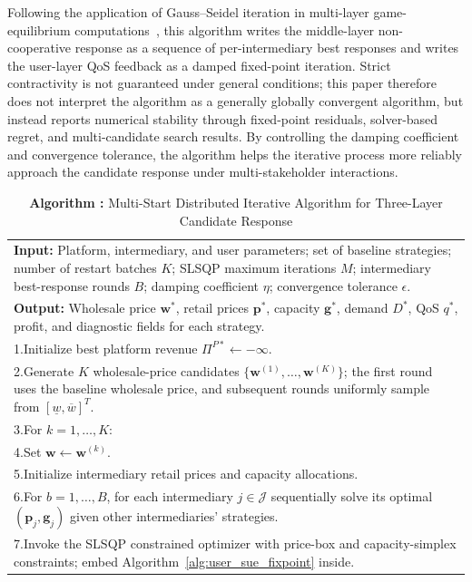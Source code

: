 \documentclass[11pt,a4paper]{article}
\newcounter{algobox}
\renewcommand{\thealgobox}{\arabic{algobox}}
\newcommand{\algcaption}[1]{\refstepcounter{algobox}\caption*{\textbf{Algorithm \thealgobox: }#1}}
\newcommand{\J}{\mathcal{J}}
\newcommand{\D}{D}
\newcommand{\w}{\boldsymbol{w}}
\newcommand{\p}{\boldsymbol{p}}
\newcommand{\g}{\boldsymbol{g}}
\begin{document}
Following the application of Gauss--Seidel iteration in multi-layer game-equilibrium computations~\cite{wang2026hierarchical}, this algorithm writes the middle-layer non-cooperative response as a sequence of per-intermediary best responses and writes the user-layer QoS feedback as a damped fixed-point iteration. Strict contractivity is not guaranteed under general conditions; this paper therefore does not interpret the algorithm as a generally globally convergent algorithm, but instead reports numerical stability through fixed-point residuals, solver-based regret, and multi-candidate search results. By controlling the damping coefficient and convergence tolerance, the algorithm helps the iterative process more reliably approach the candidate response under multi-stakeholder interactions.

\begin{table}[H]
\centering
\algcaption{Multi-Start Distributed Iterative Algorithm for Three-Layer Candidate Response}
\label{alg:full_backward}
\begin{tabular}{p{}}
\toprule
\textbf{Input:} Platform, intermediary, and user parameters; set of baseline strategies; number of restart batches $K$; SLSQP maximum iterations $M$; intermediary best-response rounds $B$; damping coefficient $\eta$; convergence tolerance $\epsilon$.\\
\textbf{Output:} Wholesale price $\w^*$, retail prices $\p^*$, capacity $\g^*$, demand $\D^*$, QoS $q^*$, profit, and diagnostic fields for each strategy.\\
\midrule
1.\quad Initialize best platform revenue $\Pi^{P*}\leftarrow -\infty$.\\
2.\quad Generate $K$ wholesale-price candidates $\{\w^{(1)},\ldots,\w^{(K)}\}$; the first round uses the baseline wholesale price, and subsequent rounds uniformly sample from $[\underline w,\overline w]^T$.\\
3.\quad For $k=1,\ldots,K$:\\
4.\quad\quad Set $\w\leftarrow\w^{(k)}$.\\
5.\quad\quad Initialize intermediary retail prices and capacity allocations.\\
6.\quad\quad For $b=1,\ldots,B$, for each intermediary $j\in\J$ sequentially solve its optimal $(\p_j,\g_j)$ given other intermediaries' strategies.\\
7.\quad\quad Invoke the SLSQP constrained optimizer with price-box and capacity-simplex constraints; embed Algorithm~\ref{alg:user_sue_fixpoint} inside.\\

\end{tabular}
\end{table}
\end{document}
